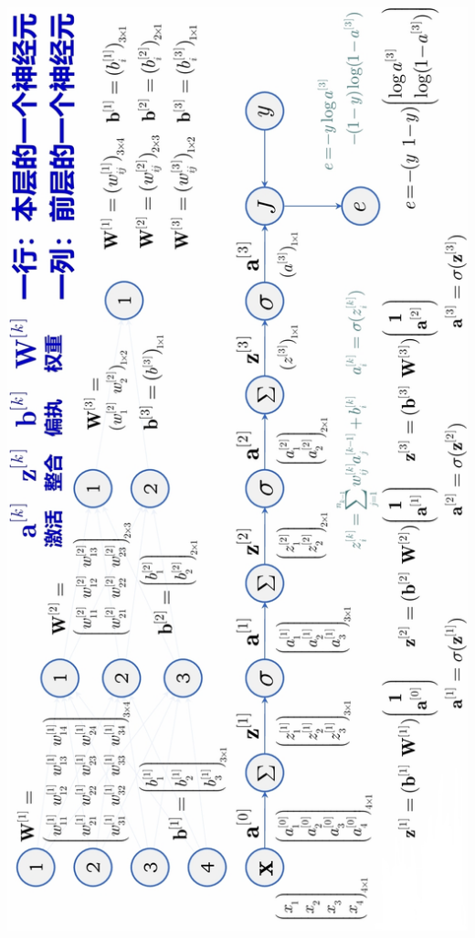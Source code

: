 	\begin{figurehere}
		\centering
		\includegraphics[width=0.85\linewidth]{image17}
		\label{fig:image17}
	\end{figurehere}
	